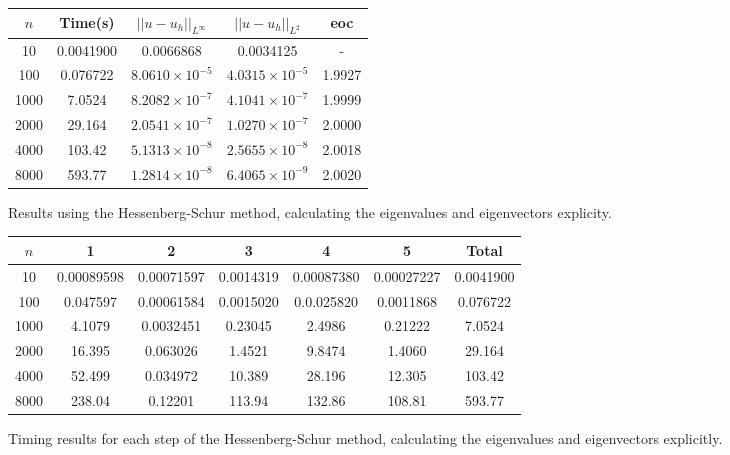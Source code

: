 \documentclass{article}
\numberwithin{equation}{section}
\begin{document}
\begin{figure}
\begin{table}[H]
\centering
\begin{tabular}{|c|c|c|c|c|}
\hline
$n$ & Time(s) & $|| u - u_h ||_{L^{\infty}}$ &$|| u - u_h ||_{L^{2}}$ & eoc \\
\hline
10 & 0.0041900 & 0.0066868 & 0.0034125 & - \\
100 & 0.076722 & $8.0610 \times 10^{-5}$ & $4.0315 \times 10^{-5}$ & 1.9927 \\
1000 & 7.0524 & $8.2082 \times 10^{-7}$ & $4.1041 \times 10^{-7}$ & 1.9999 \\
2000 & 29.164 & $2.0541 \times 10^{-7}$ & $1.0270 \times 10^{-7}$ & 2.0000 \\
4000 & 103.42 & $5.1313 \times 10^{-8}$ & $2.5655 \times 10^{-8}$ & 2.0018 \\
8000 & 593.77 & $1.2814 \times 10^{-8}$ & $6.4065 \times 10^{-9}$ & 2.0020 \\
\hline
\end{tabular}
\end{table}
\caption{Results using the Hessenberg-Schur method, calculating the eigenvalues and eigenvectors explicity.}
\end{figure}

\begin{figure}
\begin{table}[H]
\centering
\begin{tabular}{|c|c|c|c|c|c|c|}
\hline
$n$ & 1 & 2 & 3 & 4 & 5 & Total \\
\hline
10 & 0.00089598 & 0.00071597 & 0.0014319 & 0.00087380 & 0.00027227 & 0.0041900 \\
100 & 0.047597 & 0.00061584 & 0.0015020 & 0.0.025820 & 0.0011868 & 0.076722 \\
1000 & 4.1079 & 0.0032451 & 0.23045 & 2.4986 & 0.21222 & 7.0524 \\
2000 & 16.395 & 0.063026 & 1.4521 & 9.8474 & 1.4060 & 29.164 \\
4000 & 52.499 & 0.034972 & 10.389 & 28.196 & 12.305 & 103.42 \\
8000 & 238.04 & 0.12201 & 113.94 & 132.86 & 108.81 & 593.77 \\
\hline
\end{tabular}
\end{table}
\caption{Timing results for each step of the Hessenberg-Schur method, calculating the eigenvalues and eigenvectors explicitly.}
\end{figure}
\end{document}
